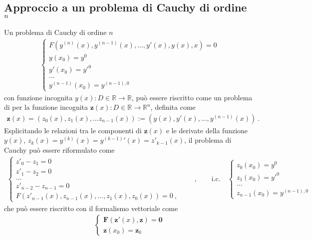 \documentclass[letterpaper,10pt,italian]{jupyterBook}
\begin{document}
\subsection{Approccio a un problema di Cauchy di ordine \protect\(n\protect\)}
\label{\detokenize{ch/numerics/ode-cauchy:approccio-a-un-problema-di-cauchy-di-ordine-n}}
\sphinxAtStartPar
Un problema di Cauchy di ordine \(n\)
\begin{equation*}
\begin{split}\begin{cases}
  F(y^{(n)}(x), y^{(n-1)}(x), \dots, y'(x), y(x), x) = 0 \\
  y(x_0) = y^0 \\
  y'(x_0) = y'^0 \\
  \dots \\
  y^{(n-1)}(x_0) = y^{(n-1),0}
\end{cases}\end{split}
\end{equation*}
\sphinxAtStartPar
con funzione incognita \(y(x): D \in \mathbb{R} \rightarrow \mathbb{R}\), può essere riscritto come un problema di  per la funzione incognita \(\mathbf{z}(x): D \in \mathbb{R} \rightarrow \mathbb{R}^n\), definita come
\begin{equation*}
\begin{split}\mathbf{z}(x) = (z_0(x), z_1(x), \dots z_{n-1}(x)) := (y(x), y'(x), \dots, y^{(n-1)}(x)) \ .\end{split}
\end{equation*}
\sphinxAtStartPar
Esplicitando le relazioni tra le componenti di \(\mathbf{z}(x)\) e le derivate della funzione \(y(x)\), \(z_{k}(x) = y^{(k)}(x) = {y^{(k-1)}}'(x) = z'_{k-1}(x)\), il problema di Cauchy può essere riformulato come
\begin{equation*}
\begin{split}\begin{cases}
z'_0 - z_1 = 0 \\
z'_1 - z_2 = 0 \\
\dots \\
z'_{n-2} - z_{n-1} = 0 \\
F(z'_{n-1}(x), z_{n-1}(x), \dots, z_1(x), z_0(x)) = 0 \ ,
\end{cases}
\qquad , \qquad
\text{i.c.} \quad
\begin{cases}
z_0(x_0) = y^0 \\
z_1(x_0) = y'^0 \\
\dots \\
z_{n-1}(x_0) = y^{(n-1),0}
\end{cases}
\end{split}
\end{equation*}
\sphinxAtStartPar
che può essere riscritto con il formalismo vettoriale come
\begin{equation*}
\begin{split}\begin{cases}
  \mathbf{F}(\mathbf{z}'(x), \mathbf{z}) = \mathbf{0} \\
  \mathbf{z}(x_0) = \mathbf{z}_0
\end{cases}\end{split}
\end{equation*}
\end{document}
